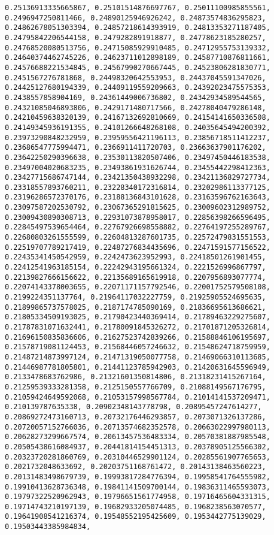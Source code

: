 \documentclass[11pt]{article}
\begin{document}
\begin{Verbatim}[commandchars=\\\{\}]
0.25136913335665867, 0.25101514876697767, 0.25011100985855561, 0.2496947250811466, 0.24890125946926242, 0.24873574836295823, 0.24862678051303394, 0.24857218614393919, 0.24813353271187405, 0.24795842206544158, 0.2479282891918877, 0.24778623185280257, 0.24768520080513756, 0.24715085929910485, 0.24712955753139332, 0.24640374462745226, 0.24623711012898189, 0.24587710876811661, 0.24576688221534845, 0.24567990270667445, 0.24523806281830771, 0.2451567276781868, 0.24498320642553953, 0.24437045591347026, 0.24425127680194339, 0.24409119559209663, 0.24392023475575353, 0.2438557858904169, 0.24361449006736802, 0.24342934589544565, 0.24321085046893806, 0.2429171480717566, 0.24278040479286148, 0.24210459638320139, 0.24167132692810669, 0.24154141650336508, 0.24149345936191355, 0.24101266648268108, 0.24035645494200392, 0.23973290848232959, 0.23959556421196113, 0.23856718511412237, 0.23686547775994471, 0.2366911411720703, 0.23663637901176202, 0.23642250290396638, 0.23530113820507406, 0.23497450446183538, 0.23497004020683235, 0.23493861931626744, 0.23455442298412363, 0.23427715686747144, 0.23421350438932298, 0.23421136829727734, 0.23318557893760211, 0.23228340172316814, 0.23202986113377125, 0.23196286572370176, 0.23188136843101628, 0.23163596762163643, 0.23097587202530792, 0.23067365291815625, 0.23009602312989752, 0.23009430890308713, 0.22931073878958017, 0.22856398266596495, 0.22845497539654464, 0.22767926698558882, 0.22764197255289767, 0.22680803261555599, 0.22604813287601735, 0.22572479831551553, 0.22519707789217419, 0.22487276834435696, 0.22471591577156522, 0.22435341450542959, 0.2242473623952993, 0.22418501261901455, 0.22412541963185154, 0.22242943195661324, 0.2221526996867797, 0.22139827666156622, 0.22135689165619918, 0.2207956893077774, 0.22074143378003655, 0.22071171157792546, 0.22001752579508108, 0.2199224351137764, 0.21964117032227759, 0.21925905524695635, 0.21899865737578025, 0.2187174785090169, 0.21836695613686621, 0.21805334509193025, 0.21790423440369414, 0.21789463229275607, 0.21787831071632441, 0.21780091845326272, 0.21701871205326814, 0.21696150835836606, 0.21627523742839266, 0.21588846106195697, 0.21578719081124453, 0.21568446057246632, 0.21548624718759959, 0.21487214873997124, 0.21471319050077758, 0.21469066310113685, 0.21446987781805801, 0.21441123785942903, 0.21420631645596949, 0.2133478683762986, 0.21321601350814806, 0.21318231415267164, 0.21259539333281358, 0.2125150557766709, 0.21088149567176795, 0.21059424649592068, 0.21053157998567784, 0.21014141537209471, 0.210139787635338, 0.20902348143778798, 0.20895457247614277, 0.20869272473160713, 0.20732176446293857, 0.2073071326137286, 0.20720057152766036, 0.20713574682352578, 0.20663022997980113, 0.20628273299667574, 0.20613457536483334, 0.20570381887985548, 0.20505438616084937, 0.20441814154451313, 0.20378905125566302, 0.20323720281860769, 0.20310446529901124, 0.20285561907765653, 0.2021732048633692, 0.20203751168761472, 0.20143138463560223, 0.20131483498679739, 0.19993817284776394, 0.19958541764555982, 0.19910413628736348, 0.19841141509700144, 0.19836311465593073, 0.19797322520962943, 0.19796651561774958, 0.19716465604331315, 0.19714743210197139, 0.19682933205074485, 0.1968238563070577, 0.19641908541216374, 0.19548552195425609, 0.1953442775139029, 0.19503443385984834, 
\end{Verbatim}
\end{document}
